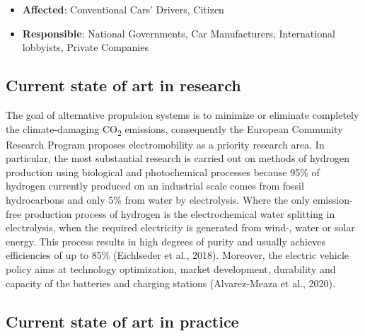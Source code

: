 \documentclass[
]{book}
\providecommand{\tightlist}{%
  \setlength{\itemsep}{0pt}\setlength{\parskip}{0pt}}
\begin{document}
\begin{itemize}
\tightlist
\item
  \textbf{Affected}: Conventional Cars' Drivers, Citizen
\item
  \textbf{Responsible}: National Governments, Car Manufacturers, International lobbyists, Private Companies
\end{itemize}

\hypertarget{current-state-of-art-in-research-9}{%
\subsection*{Current state of art in research}\label{current-state-of-art-in-research-9}}

The goal of alternative propulsion systems is to minimize or eliminate completely the climate-damaging CO\textsubscript{2} emissions, consequently the European Community Research Program proposes electromobility as a priority research area. In particular, the most substantial research is carried out on methods of hydrogen production using biological and photochemical processes because 95\% of hydrogen currently produced on an industrial scale comes from fossil hydrocarbons and only 5\% from water by electrolysis. Where the only emission-free production process of hydrogen is the electrochemical water splitting in electrolysis, when the required electricity is generated from wind-, water or solar energy. This process results in high degrees of purity and usually achieves efficiencies of up to 85\% (Eichlseder et al., 2018). Moreover, the electric vehicle policy aims at technology optimization, market development, durability and capacity of the batteries and charging stations (Alvarez-Meaza et al., 2020).

\hypertarget{current-state-of-art-in-practice-9}{%
\subsection*{Current state of art in practice}\label{current-state-of-art-in-practice-9}}
\end{document}
